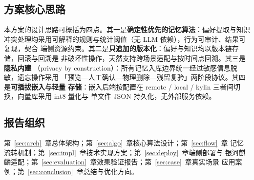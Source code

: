 \subsection{方案核心思路}

本方案的设计思路可概括为四点。其一是\textbf{确定性优先的记忆算法}：偏好提取与知识
冲突处理均采用可解释的规则与统计阈值（无 LLM 依赖），行为可审计、结果可复现，契合
端侧资源约束。其二是\textbf{只追加的版本化}：偏好与知识均以版本链存储，回滚与回溯是
非破坏性操作，天然支持跨场景适配与按时间点回溯。其三是\textbf{隐私内建}
（privacy by construction）：所有记忆入库边界统一经过敏感信息脱敏，遗忘操作采用
「预览—人工确认—物理删除—残留复验」两阶段协议。其四是\textbf{可插拔嵌入与轻量
存储}：嵌入后端按配置在 remote / local / kylin 三者间切换，向量库采用 int8 量化与
单文件 JSON 持久化，无外部服务依赖。

\subsection{报告组织}

第~\ref{sec:arch}~章总体架构；第~\ref{sec:algo}~章核心算法设计；第~\ref{sec:flow}~章
记忆流转机制；第~\ref{sec:impl}~章技术实现方案；第~\ref{sec:deploy}~章端侧部署与
银河麒麟适配；第~\ref{sec:evaluation}~章效果验证报告；第~\ref{sec:case}~章真实场景
应用案例；第~\ref{sec:conclusion}~章总结与优化方向。
